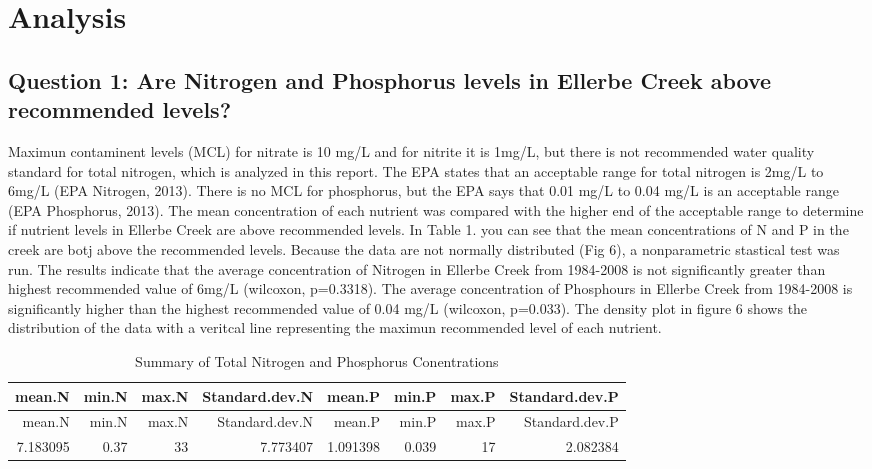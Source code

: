 \documentclass[12pt,]{article}
\begin{document}
\newpage

\newpage

\hypertarget{analysis}{%
\section{Analysis}\label{analysis}}

\hypertarget{question-1-are-nitrogen-and-phosphorus-levels-in-ellerbe-creek-above-recommended-levels}{%
\subsection{Question 1: Are Nitrogen and Phosphorus levels in Ellerbe
Creek above recommended
levels?}\label{question-1-are-nitrogen-and-phosphorus-levels-in-ellerbe-creek-above-recommended-levels}}

Maximun contaminent levels (MCL) for nitrate is 10 mg/L and for nitrite
it is 1mg/L, but there is not recommended water quality standard for
total nitrogen, which is analyzed in this report. The EPA states that an
acceptable range for total nitrogen is 2mg/L to 6mg/L (EPA Nitrogen,
2013). There is no MCL for phosphorus, but the EPA says that 0.01 mg/L
to 0.04 mg/L is an acceptable range (EPA Phosphorus, 2013). The mean
concentration of each nutrient was compared with the higher end of the
acceptable range to determine if nutrient levels in Ellerbe Creek are
above recommended levels. In Table 1. you can see that the mean
concentrations of N and P in the creek are botj above the recommended
levels. Because the data are not normally distributed (Fig 6), a
nonparametric stastical test was run. The results indicate that the
average concentration of Nitrogen in Ellerbe Creek from 1984-2008 is not
significantly greater than highest recommended value of 6mg/L (wilcoxon,
p=0.3318). The average concentration of Phosphours in Ellerbe Creek from
1984-2008 is significantly higher than the highest recommended value of
0.04 mg/L (wilcoxon, p=0.033). The density plot in figure 6 shows the
distribution of the data with a veritcal line representing the maximun
recommended level of each nutrient.

\begin{longtable}[]{@{}rrrrrrrr@{}}
\caption{Summary of Total Nitrogen and Phosphorus
Conentrations}\tabularnewline
\toprule
mean.N & min.N & max.N & Standard.dev.N & mean.P & min.P & max.P &
Standard.dev.P\tabularnewline
\midrule
\endfirsthead
\toprule
mean.N & min.N & max.N & Standard.dev.N & mean.P & min.P & max.P &
Standard.dev.P\tabularnewline
\midrule
\endhead
7.183095 & 0.37 & 33 & 7.773407 & 1.091398 & 0.039 & 17 &
2.082384\tabularnewline
\bottomrule
\end{longtable}
\end{document}
